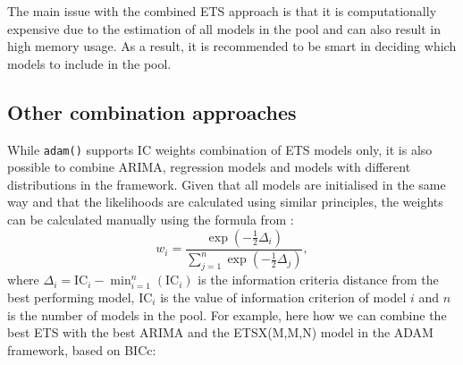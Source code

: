 \documentclass[
]{book}
\theoremstyle{definition}
\theoremstyle{definition}
\theoremstyle{definition}
\theoremstyle{definition}
\theoremstyle{remark}
\begin{document}
The main issue with the combined ETS approach is that it is computationally expensive due to the estimation of all models in the pool and can also result in high memory usage. As a result, it is recommended to be smart in deciding which models to include in the pool.

\hypertarget{other-combination-approaches}{%
\subsection{Other combination approaches}\label{other-combination-approaches}}

While \texttt{adam()} supports IC weights combination of ETS models only, it is also possible to combine ARIMA, regression models and models with different distributions in the framework. Given that all models are initialised in the same way and that the likelihoods are calculated using similar principles, the weights can be calculated manually using the formula from \citet{Burnham2004}:
\begin{equation}
    w_i = \frac{\exp\left(-\frac{1}{2}\Delta_i\right)}{\sum_{j=1}^n \exp\left(-\frac{1}{2}\Delta_j\right)},
  \label{eq:ETSADAMStateSpaceEstimated}
\end{equation}
where \(\Delta_i=\mathrm{IC}_i -\min_{i=1}^n \left(\mathrm{IC}_i\right)\) is the information criteria distance from the best performing model, \(\mathrm{IC}_i\) is the value of information criterion of model \(i\) and \(n\) is the number of models in the pool. For example, here how we can combine the best ETS with the best ARIMA and the ETSX(M,M,N) model in the ADAM framework, based on BICc:
\end{document}
